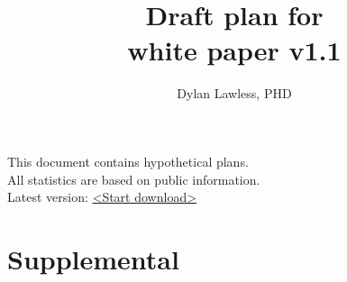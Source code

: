 \documentclass{article}
\newcommand{\whitepaperversion}{white paper v1.1}
\begin{document}
%


\title{\Large \bf Draft plan for \pmu\\
{\whitepaperversion}}
\author[1]{\rm Dylan Lawless, PHD}

\maketitle
\color{kispiblack}
This document contains hypothetical plans.\\
All statistics are based on public information.\\
Latest version: \href{https://downgit.github.io/#/home?url=https://github.com/DylanLawless/precision_med_group/blob/main/whitepaper_1/whitepaper_1.1.pdf}{<Start download>}
\tableofcontents
{} 
\clearpage


 \clearpage
 \clearpage
















\clearpage

\clearpage






\beginsupplement
\section{Supplemental}
\label{sec:Supplemental_text}

\end{document}
